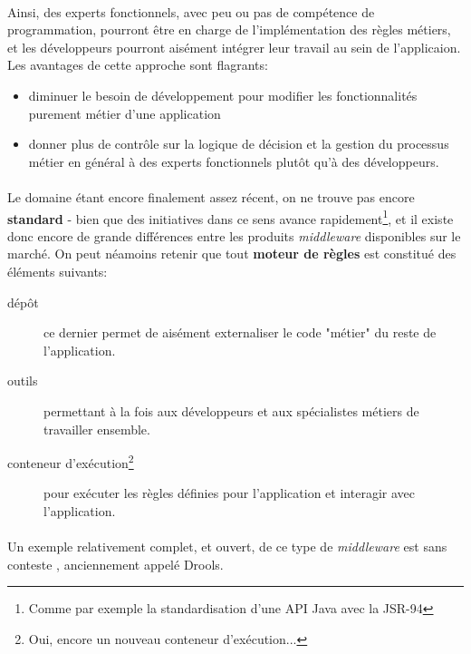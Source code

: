 {  \paragraph{} Ainsi, des experts fonctionnels, avec peu ou pas de compétence de programmation,
  pourront être en charge de l'implémentation des règles métiers, et les développeurs pourront
  aisément intégrer leur travail au sein de l'applicaion. Les avantages de cette approche sont
  flagrants:

  \begin{itemize}
    \item diminuer le besoin de développement pour modifier les fonctionnalités purement métier d'une
    application
    \item donner plus de contrôle sur la logique de décision et la gestion du processus métier en
    général à des experts fonctionnels plutôt qu'à des développeurs.
  \end{itemize}

  \paragraph{} Le domaine étant encore finalement assez récent, on ne trouve pas encore
  \textbf{standard} - bien que des initiatives dans ce sens avance rapidement\footnote{Comme par
  exemple la standardisation d'une API Java avec la JSR-94}, et il existe donc
  encore de grande différences entre les produits \textit{middleware} disponibles sur le marché. On
  peut néamoins retenir que tout \textbf{moteur de règles} est constitué des éléments suivants:

  \begin{description}
      \item[dépôt] ce dernier permet de aisément externaliser le code "métier" du reste de
      l'application.
      \item[outils] permettant à la fois aux développeurs et aux spécialistes métiers de travailler
      ensemble.
      \item[conteneur d'exécution\footnote{Oui, encore un nouveau conteneur d'exécution...}] pour
      exécuter les règles définies pour l'application et interagir avec l'application.
  \end{description}

  \paragraph{} Un exemple relativement complet, et ouvert, de ce type de \textit{middleware} est sans
  conteste , anciennement appelé
  Drools.

}


